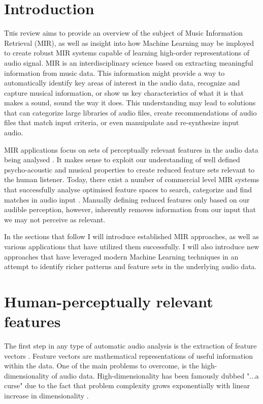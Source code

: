 \documentclass[twoside]{article}
\begin{document}
\begin{multicols}{2} %

\section{Introduction}

\lettrine[nindent=0em,lines=1]{T}his review aims to provide an overview of the subject of Music Information Retrieval (MIR), as well as insight into how Machine Learning
may be imployed to create robust MIR systems capable of learning high-order representations of audio signal. MIR is an interdisciplinary 
science based on extracting meaningful information from music data. This information might provide a way to automatically identify key areas of interest
in the audio data, recognize and capture musical information, or show us key characteristics of what it is that makes a sound, sound the way it does. This understanding may lead to solutions that can categorize large libraries of audio files, create recommendations of audio files that match input criteria, or even manuipulate and re-synthesize input audio.

MIR applications focus on sets of perceptually relevant features in the audio data being analysed \citep{Lidy05,mirSurvey05}. It makes sense to exploit our understanding of well defined psycho-acoustic and musical properties to create reduced feature sets relevant to the human listener. Today, there exist a number of commercial level MIR systems that successfully analyse optimised feature spaces to search, categorize and find matches in audio input \citep{mirSurvey05}. Manually defining reduced features only based on our audible perception, however, inherently removes information from our input that we may not perceive as relevant. 

In the sections that follow I will introduce established MIR approaches, as well as various applications that have utilized them successfully. I will also introduce new approaches that have leveraged modern Machine Learning techniques in an attempt to identify richer patterns and feature sets in the underlying audio data.

\section{Human-perceptually relevant features}
The first step in any type of automatic audio analysis is the extraction of feature vectors \citep{Tzanetakis02}. Feature vectors are mathematical representations of useful information within the data. One of the main problems to overcome, is the high-dimensionality of audio data. High-dimensionality has been famously dubbed "...a curse" \citep{Bellman57} due to the fact that problem complexity grows exponentially with linear increase in dimensionality \citep{DeepLearningSurvey2010}.


\end{multicols}
\end{document}
